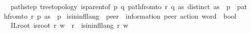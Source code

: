 \begin{isabellebody}
\ \ path{\isacharunderscore}{\kern0pt}step{\isacharcolon}{\kern0pt}\ {\isachardoublequoteopen}{\isasymlbrakk}tree{\isacharunderscore}{\kern0pt}topology{\isacharsemicolon}{\kern0pt}\ is{\isacharunderscore}{\kern0pt}parent{\isacharunderscore}{\kern0pt}of\ p\ q{\isacharsemicolon}{\kern0pt}\ path{\isacharunderscore}{\kern0pt}from{\isacharunderscore}{\kern0pt}to\ r\ q\ as{\isacharsemicolon}{\kern0pt}\ distinct\ {\isacharparenleft}{\kern0pt}as\ {\isacharat}{\kern0pt}\ {\isacharbrackleft}{\kern0pt}p{\isacharbrackright}{\kern0pt}{\isacharparenright}{\kern0pt}{\isasymrbrakk}\ {\isasymLongrightarrow}\ path{\isacharunderscore}{\kern0pt}from{\isacharunderscore}{\kern0pt}to\ r\ p\ {\isacharparenleft}{\kern0pt}as\ {\isacharat}{\kern0pt}\ {\isacharbrackleft}{\kern0pt}p{\isacharbrackright}{\kern0pt}{\isacharparenright}{\kern0pt}{\isachardoublequoteclose}%
\isadelimdocument
%
\endisadelimdocument
%
\isatagdocument
%
\isamarkuptrue%
%
\endisatagdocument
{\isafolddocument}%
%
\isadelimdocument
%
\endisadelimdocument
{}\isamarkupfalse%
\ is{\isacharunderscore}{\kern0pt}in{\isacharunderscore}{\kern0pt}infl{\isacharunderscore}{\kern0pt}lang\ {\isacharcolon}{\kern0pt}{\isacharcolon}{\kern0pt}\ {\isachardoublequoteopen}{\isacharprime}{\kern0pt}peer\ {\isasymRightarrow}\ {\isacharparenleft}{\kern0pt}{\isacharprime}{\kern0pt}information{\isacharcomma}{\kern0pt}\ {\isacharprime}{\kern0pt}peer{\isacharparenright}{\kern0pt}\ action\ word\ {\isasymRightarrow}\ bool{\isachardoublequoteclose}\ \isanewline
\ \ IL{\isacharunderscore}{\kern0pt}root{\isacharcolon}{\kern0pt}\ {\isachardoublequoteopen}{\isasymlbrakk}is{\isacharunderscore}{\kern0pt}root\ r{\isacharsemicolon}{\kern0pt}\ w\ {\isasymin}\ {\isasymL}{\isacharparenleft}{\kern0pt}r{\isacharparenright}{\kern0pt}{\isasymrbrakk}\ {\isasymLongrightarrow}\ is{\isacharunderscore}{\kern0pt}in{\isacharunderscore}{\kern0pt}infl{\isacharunderscore}{\kern0pt}lang\ r\ w{\isachardoublequoteclose}\ {\isacharbar}{\kern0pt}\ %
\isanewline

\end{isabellebody}
